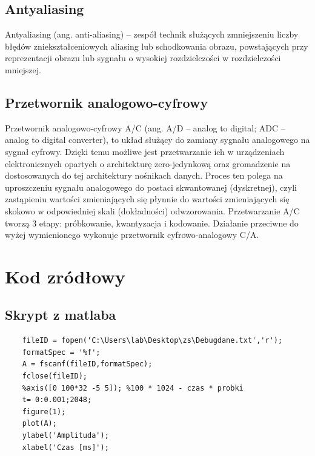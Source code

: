 \documentclass[12pt]{article}
\begin{document}
\subsection{Antyaliasing}
Antyaliasing (ang. anti-aliasing) – zespół technik służących zmniejszeniu liczby błędów zniekształceniowych aliasing lub schodkowania obrazu, powstających przy reprezentacji obrazu lub sygnału o wysokiej rozdzielczości w rozdzielczości mniejszej.\par
\subsection{Przetwornik analogowo-cyfrowy}
Przetwornik analogowo-cyfrowy A/C (ang. A/D – analog to digital; ADC – analog to digital converter), to układ służący do zamiany sygnału analogowego na sygnał cyfrowy. Dzięki temu możliwe jest przetwarzanie ich w urządzeniach elektronicznych opartych o architekturę zero-jedynkową oraz gromadzenie na dostosowanych do tej architektury nośnikach danych. Proces ten polega na uproszczeniu sygnału analogowego do postaci skwantowanej (dyskretnej), czyli zastąpieniu wartości zmieniających się płynnie do wartości zmieniających się skokowo w odpowiedniej skali (dokładności) odwzorowania. Przetwarzanie A/C tworzą 3 etapy: próbkowanie, kwantyzacja i kodowanie. Działanie przeciwne do wyżej wymienionego wykonuje przetwornik cyfrowo-analogowy C/A.\par
\section{Kod zródłowy}
\subsection{Skrypt z matlaba}
\begin{verbatim}
	fileID = fopen('C:\Users\lab\Desktop\zs\Debugdane.txt','r');
	formatSpec = '%f';
	A = fscanf(fileID,formatSpec);
	fclose(fileID);
	%axis([0 100*32 -5 5]); %100 * 1024 - czas * probki
	t= 0:0.001;2048;
	figure(1);
	plot(A);
	ylabel('Amplituda');
	xlabel('Czas [ms]');
\end{verbatim}
\end{document}

